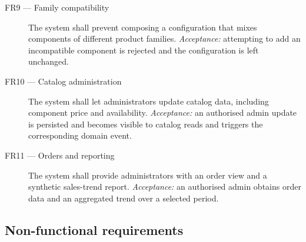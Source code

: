 \begin{description}
  \item[FR9 --- Family compatibility] The system shall prevent composing a
  configuration that mixes components of different product families.
  \emph{Acceptance:} attempting to add an incompatible component is rejected and
  the configuration is left unchanged.

  \item[FR10 --- Catalog administration] The system shall let administrators
  update catalog data, including component price and availability.
  \emph{Acceptance:} an authorised admin update is persisted and becomes visible
  to catalog reads and triggers the corresponding domain event.

  \item[FR11 --- Orders and reporting] The system shall provide administrators
  with an order view and a synthetic sales-trend report. \emph{Acceptance:} an
  authorised admin obtains order data and an aggregated trend over a selected
  period.
\end{description}

\subsection{Non-functional requirements}\label{non-functional-requirements}


